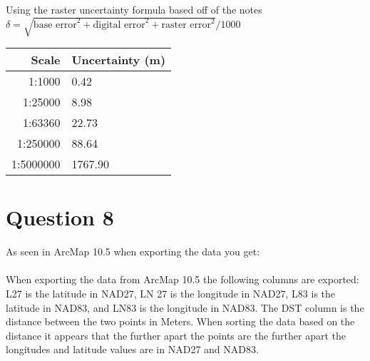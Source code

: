 \documentclass[fleqn, 12pt]{article}
\begin{document}
Using the raster uncertainty formula based off of the notes\\ $\delta = \sqrt{\text{base error}^2 + \text{digital error}^2 + \text{raster error}^2} / 1000$\\

\begin{tabular}{rl}
    \hline
    Scale & Uncertainty (m)\\
    \hline
    1:1000 & 0.42\\
    1:25000 & 8.98\\
    1:63360 & 22.73\\
    1:250000 & 88.64\\
    1:5000000 & 1767.90\\\hline
\end{tabular}

\section*{Question 8}

As seen in ArcMap 10.5 when exporting the data you get:\\

\\

When exporting the data from ArcMap 10.5 the following columns are exported: L27 is the latitude in NAD27, LN 27 is the longitude in NAD27, L83 is the latitude in NAD83, and LN83 is the longitude in NAD83. The DST column is the distance between the two points in Meters. When sorting the data based on the distance it appears that the further apart the points are the further apart the longitudes and latitude values are in NAD27 and NAD83.
\end{document}
